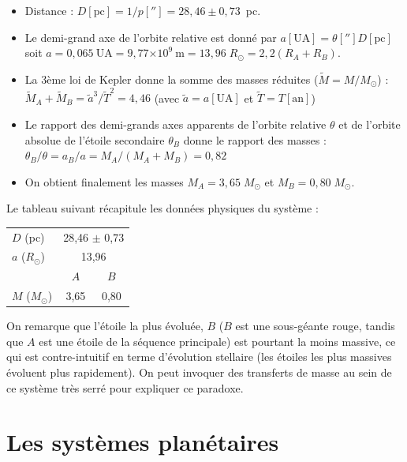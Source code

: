 \documentclass[a4paper,10pt]{report}
\newcommand{\e}[1]{\ensuremath{\times 10^{#1}}}
\renewcommand{\u}[1]{\ensuremath{\mathrm{#1}}} %
\begin{document}
\begin{Answer}
  \begin{itemize}
  \item Distance : $D [\u{pc}] = 1/p[''] = 28,46 \pm 0,73$~pc.
  \item Le demi-grand axe de l'orbite relative est donné par $a
    [\u{UA}] = \theta [''] D [\u{pc}]$ soit $a = 0,065~\u{UA} =
    9,77\e{9}~\u{m} = 13,96\;R_{\odot} = 2,2 (R_{A}+R_{B})$.
  \item La 3ème loi de Kepler donne la somme des masses réduites
    ($\tilde{M} = M/M_{\odot}$) : $\tilde{M}_A + \tilde{M}_B =
    \tilde{a}^3/\tilde{T}^2 = 4,46$ (avec $\tilde{a} = a[\u{UA}]$ et
    $\tilde{T} = T[\u{an}]$)
  \item Le rapport des demi-grands axes apparents de l'orbite relative
    $\theta$ et de l'orbite absolue de l'étoile secondaire $\theta_B$
    donne le rapport des masses : $\theta_B / \theta = a_B / a = M_A /
    (M_A + M_B) = 0,82$
  \item On obtient finalement les masses $M_A = 3,65\;M_{\odot}$ et $M_B =
    0,80\;M_{\odot}$.
  \end{itemize}
  Le tableau suivant récapitule les données physiques du système :
  \begin{center}
    \begin{tabular}{lcc}
      \toprule
      $D$ (pc) & \multicolumn{2}{c}{28,46 $\pm$ 0,73} \\
      $a$ ($R_{\odot}$) &  \multicolumn{2}{c}{13,96} \\
      \midrule
      & $A$ & $B$ \\
      \cmidrule(r){2-3}
      $M$ ($M_{\odot}$) & 3,65 & 0,80 \\
      \bottomrule
    \end{tabular}
  \end{center}
  On remarque que l'étoile la plus évoluée, $B$ ($B$ est une
  sous-géante rouge, tandis que $A$ est une étoile de la séquence
  principale) est pourtant la moins massive, ce qui est
  contre-intuitif en terme d'évolution stellaire (les étoiles les plus
  massives évoluent plus rapidement). On peut invoquer des transferts
  de masse au sein de ce système très serré pour expliquer ce
  paradoxe.
\end{Answer}

\section{Les systèmes planétaires}
\end{document}

